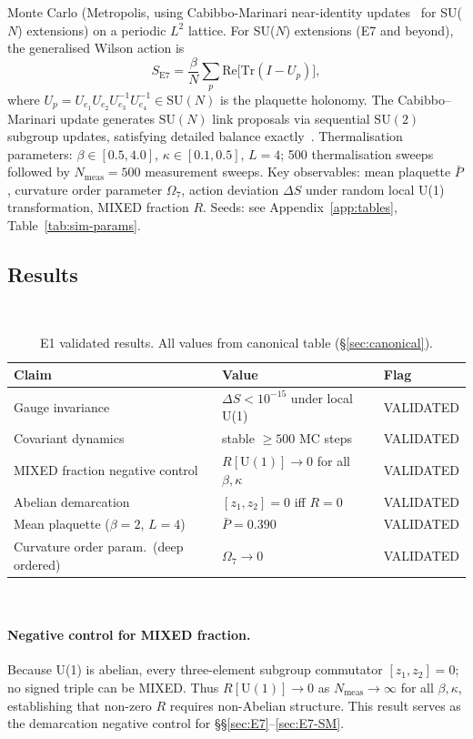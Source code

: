 \documentclass[12pt,a4paper]{article}
\theoremstyle{plain}
\theoremstyle{definition}
\theoremstyle{remark}
\newcommand{\PlaqMean}{0.390}
\begin{document}
Monte Carlo (Metropolis, using Cabibbo-Marinari near-identity updates~\cite{CabibboMarinari1982} for SU($N$) extensions) on a periodic $L^2$ lattice.
For SU($N$) extensions (E7 and beyond), the generalised Wilson action is
\begin{equation}\label{eq:SE7}
  S_{\mathrm{E7}} = \frac{\beta}{N}\sum_p \mathrm{Re}\bigl[\mathrm{Tr}(I - U_p)\bigr],
\end{equation}
where $U_p = U_{e_1}U_{e_2}U_{e_3}^{-1}U_{e_4}^{-1}\in\mathrm{SU}(N)$ is
the plaquette holonomy.
The Cabibbo--Marinari update generates $\mathrm{SU}(N)$ link proposals
via sequential $\mathrm{SU}(2)$ subgroup updates, satisfying detailed
balance exactly~\cite{CabibboMarinari1982}.
Thermalisation parameters: $\beta\in[0.5,4.0]$, $\kappa\in[0.1,0.5]$,
$L=4$; 500 thermalisation sweeps followed by $N_{\mathrm{meas}}=500$
measurement sweeps.
Key observables: mean plaquette $\bar{P}$, curvature order parameter
$\Omega_7$, action deviation $\Delta S$ under random local U(1)
transformation, MIXED fraction $R$.
Seeds: see Appendix~\ref{app:tables}, Table~\ref{tab:sim-params}.

\subsection{Results}

\begin{table}[htbp]
\caption{E1 validated results. All values from canonical table (\S\ref{sec:canonical}).}
\label{tab:E1}
\
\begin{tabular}{p{5cm}ll}
\toprule
Claim & Value & Flag \\
\midrule
Gauge invariance & $\Delta S < 10^{-15}$ under local U(1) & VALIDATED \\
Covariant dynamics & stable $\geq 500$ MC steps & VALIDATED \\
MIXED fraction negative control & $R[\mathrm{U(1)}]\to 0$ for all $\beta,\kappa$ & VALIDATED \\
Abelian demarcation & $[z_1,z_2]=0$ iff $R=0$ & VALIDATED \\
Mean plaquette ($\beta=2$, $L=4$) & $\bar{P} = \PlaqMean$ & VALIDATED \\
Curvature order param.\ (deep ordered) & $\Omega_7\to 0$ & VALIDATED \\
\bottomrule
\end{tabular}
\
\end{table}

\paragraph{Negative control for MIXED fraction.}
Because U(1) is abelian, every three-element subgroup commutator
$[z_1,z_2] = 0$; no signed triple can be MIXED.
Thus $R[\mathrm{U}(1)]\to 0$ as $N_{\mathrm{meas}}\to\infty$ for all
$\beta,\kappa$, establishing that non-zero $R$ requires non-Abelian structure.
This result serves as the demarcation negative control for
\S\S\ref{sec:E7}--\ref{sec:E7-SM}.
\end{document}

